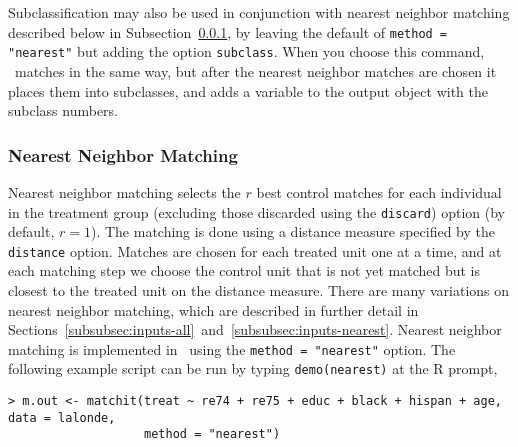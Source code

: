 Subclassification may also be used in conjunction with nearest
neighbor matching described below in
Subsection~\ref{subsubsec:nearest}, by leaving the default of
\texttt{method = "nearest"} but adding the option \texttt{subclass}.
When you choose this command, \MatchIt\ matches in the same way, but
after the nearest neighbor matches are chosen it places them into
subclasses, and adds a variable to the output object with the subclass
numbers.

\subsubsection{Nearest Neighbor Matching}
\label{subsubsec:nearest}

Nearest neighbor matching selects the $r$ best control matches for
each individual in the treatment group (excluding those discarded
using the \texttt{discard}) option (by default, $r=1$).  The matching
is done using a distance measure specified by the {\tt distance}
option. Matches are chosen for each treated unit one at a time, and at
each matching step we choose the control unit that is not yet matched
but is closest to the treated unit on the distance measure.  There are
many variations on nearest neighbor matching, which are described in
further detail in
Sections~\ref{subsubsec:inputs-all}~and~\ref{subsubsec:inputs-nearest}.
Nearest neighbor matching is implemented in \MatchIt\ using the
\texttt{method = "nearest"} option.  The following example script can
be run by typing {\tt demo(nearest)} at the R prompt,
\begin{verbatim}
> m.out <- matchit(treat ~ re74 + re75 + educ + black + hispan + age, data = lalonde, 
                   method = "nearest")
\end{verbatim}



